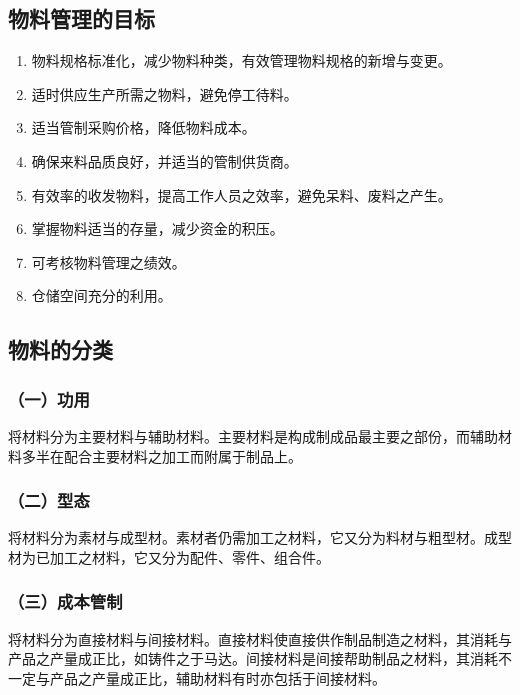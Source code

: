 \subsection { 物料管理的目标}

    \begin{enumerate}
        \item  物料规格标准化，减少物料种类，有效管理物料规格的新增与变更。
        \item  适时供应生产所需之物料，避免停工待料。
        \item  适当管制采购价格，降低物料成本。
        \item  确保来料品质良好，并适当的管制供货商。
        \item  有效率的收发物料，提高工作人员之效率，避免呆料、废料之产生。
        \item  掌握物料适当的存量，减少资金的积压。
        \item  可考核物料管理之绩效。
        \item  仓储空间充分的利用。
    \end{enumerate}

\subsection { 物料的分类}

    \subsubsection {（一）功用}

    将材料分为主要材料与辅助材料。主要材料是构成制成品最主要之部份，而辅助材料多半在配合主要材料之加工而附属于制品上。

    \subsubsection {（二）型态}

    将材料分为素材与成型材。素材者仍需加工之材料，它又分为料材与粗型材。成型材为已加工之材料，它又分为配件、零件、组合件。

    \subsubsection {（三）成本管制}

    将材料分为直接材料与间接材料。直接材料使直接供作制品制造之材料，其消耗与产品之产量成正比，如铸件之于马达。间接材料是间接帮助制品之材料，其消耗不一定与产品之产量成正比，辅助材料有时亦包括于间接材料。

